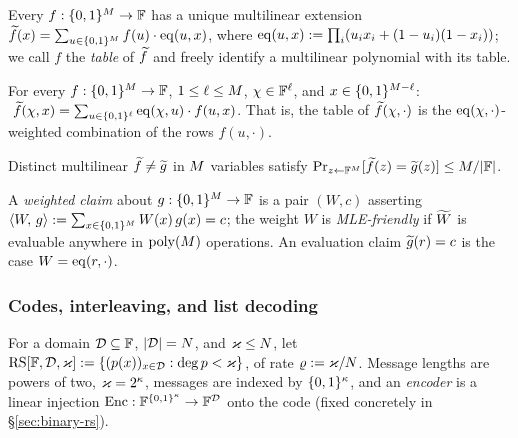 Every $f : \{0,1\}^{M} \to \mathbb{F}$ has a unique multilinear extension $\widetilde{f}(x) = \sum_{u \in \{0,1\}^{M}} f(u) \cdot \operatorname{eq}(u, x)$, where $\operatorname{eq}(u, x) := \prod_{i}(u_i x_i + (1-u_i)(1-x_i))$; we call $f$ the \emph{table} of $\widetilde{f}$ and freely identify a multilinear polynomial with its table.

\begin{fact}\label{fact:fold}
For every $f : \{0,1\}^{M} \to \mathbb{F}$, $1 \le \ell \le M$, $\chi \in \mathbb{F}^{\ell}$, and $x \in \{0,1\}^{M - \ell}$: $\ \widetilde{f}(\chi, x) = \sum_{u \in \{0,1\}^{\ell}} \operatorname{eq}(\chi, u) \cdot f(u, x)$. That is, the table of $\widetilde{f}(\chi, \cdot)$ is the $\operatorname{eq}(\chi, \cdot)$-weighted combination of the rows $f(u, \cdot)$.
\end{fact}

\begin{fact}\label{fact:sz}
Distinct multilinear $\widetilde{f} \neq \widetilde{g}$ in $M$ variables satisfy $\Pr_{z \leftarrow \mathbb{F}^{M}}[\widetilde{f}(z) = \widetilde{g}(z)] \le M / |\mathbb{F}|$.
\end{fact}

\begin{definition}\label{def:claim}
A \emph{weighted claim} about $g : \{0,1\}^{M} \to \mathbb{F}$ is a pair $(W, c)$ asserting $\langle W,\, g \rangle := \sum_{x \in \{0,1\}^{M}} W(x)\, g(x) = c$; the weight $W$ is \emph{MLE-friendly} if $\widetilde{W}$ is evaluable anywhere in $\mathrm{poly}(M)$ operations. An evaluation claim $\widetilde{g}(r) = c$ is the case $W = \operatorname{eq}(r, \cdot)$.
\end{definition}

\subsubsection{Codes, interleaving, and list decoding}\label{sec:codes}

For a domain $\mathcal{D} \subseteq \mathbb{F}$, $|\mathcal{D}| = N$, and $\varkappa \le N$, let $\mathrm{RS}[\mathbb{F}, \mathcal{D}, \varkappa] := \{ (p(x))_{x \in \mathcal{D}} : \deg p < \varkappa \}$, of rate $\varrho := \varkappa/N$. Message lengths are powers of two, $\varkappa = 2^{\kappa}$, messages are indexed by $\{0,1\}^{\kappa}$, and an \emph{encoder} is a linear injection $\mathrm{Enc} : \mathbb{F}^{\{0,1\}^{\kappa}} \to \mathbb{F}^{\mathcal{D}}$ onto the code (fixed concretely in \S\ref{sec:binary-rs}).


